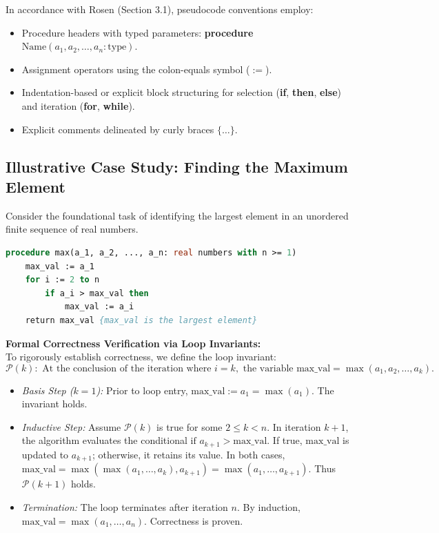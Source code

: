 \documentclass[10pt,a4paper]{article}
\theoremstyle{definition}
\begin{document}
In accordance with Rosen (Section 3.1), pseudocode conventions employ:
\begin{itemize}[leftmargin=*,itemsep=0pt,topsep=1pt]
    \item Procedure headers with typed parameters: \textbf{procedure} $\text{Name}(a_1, a_2, \dots, a_n: \text{type})$.
    \item Assignment operators using the colon-equals symbol ($:=$).
    \item Indentation-based or explicit block structuring for selection (\textbf{if}, \textbf{then}, \textbf{else}) and iteration (\textbf{for}, \textbf{while}).
    \item Explicit comments delineated by curly braces $\{ \dots \}$.
\end{itemize}

\subsection{Illustrative Case Study: Finding the Maximum Element}
Consider the foundational task of identifying the largest element in an unordered finite sequence of real numbers.

\begin{lstlisting}[language=Pascal,caption={Finding the Maximum Element (Rosen Algorithm 1)}]
procedure max(a_1, a_2, ..., a_n: real numbers with n >= 1)
    max_val := a_1
    for i := 2 to n
        if a_i > max_val then
            max_val := a_i
    return max_val {max_val is the largest element}
\end{lstlisting}

\noindent\textbf{Formal Correctness Verification via Loop Invariants:}\\
To rigorously establish correctness, we define the loop invariant:
$$\mathcal{P}(k): \text{ At the conclusion of the iteration where } i = k, \text{ the variable } \text{max\_val} = \max(a_1, a_2, \dots, a_k).$$
\begin{itemize}[leftmargin=*,itemsep=0pt,topsep=1pt]
    \item \textit{Basis Step ($k=1$):} Prior to loop entry, $\text{max\_val} := a_1 = \max(a_1)$. The invariant holds.
    \item \textit{Inductive Step:} Assume $\mathcal{P}(k)$ is true for some $2 \le k < n$. In iteration $k+1$, the algorithm evaluates the conditional $\text{if } a_{k+1} > \text{max\_val}$. If true, $\text{max\_val}$ is updated to $a_{k+1}$; otherwise, it retains its value. In both cases, $\text{max\_val} = \max(\max(a_1, \dots, a_k), a_{k+1}) = \max(a_1, \dots, a_{k+1})$. Thus $\mathcal{P}(k+1)$ holds.
    \item \textit{Termination:} The loop terminates after iteration $n$. By induction, $\text{max\_val} = \max(a_1, \dots, a_n)$. Correctness is proven.
\end{itemize}
\end{document}
